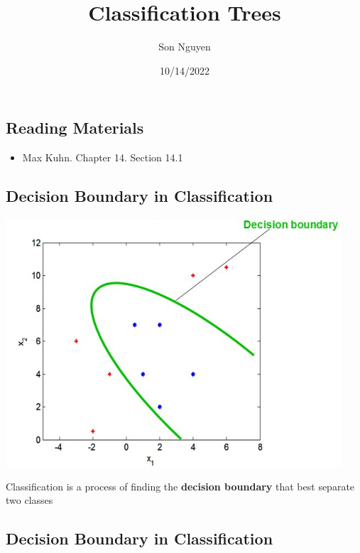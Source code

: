 \documentclass[
]{article}
\title{Classification Trees}
\author{Son Nguyen}
\date{10/14/2022}
\providecommand{\tightlist}{%
  \setlength{\itemsep}{0pt}\setlength{\parskip}{0pt}}
\begin{document}
\maketitle

\hypertarget{reading-materials}{%
\subsection{Reading Materials}\label{reading-materials}}

\begin{itemize}
\tightlist
\item
  Max Kuhn. Chapter 14. Section 14.1
\end{itemize}

\hypertarget{decision-boundary-in-classification}{%
\subsection{Decision Boundary in
Classification}\label{decision-boundary-in-classification}}

\includegraphics{images/db.png}

Classification is a process of finding the \textbf{decision boundary}
that best separate two classes

\hypertarget{decision-boundary-in-classification-1}{%
\subsection{Decision Boundary in
Classification}\label{decision-boundary-in-classification-1}}
\end{document}
